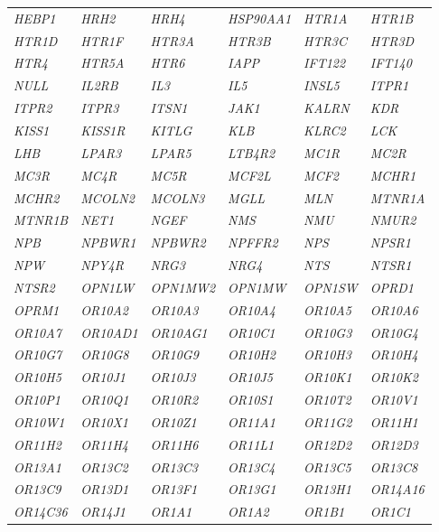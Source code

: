\begin{longtable}{>{\em}l>{\em}l>{\em}l>{\em}l>{\em}l>{\em}l}
  HEBP1 & HRH2 & HRH4 & HSP90AA1 & HTR1A & HTR1B \\ 
  \rowcolor{black!10} 
  HTR1D & HTR1F & HTR3A & HTR3B & HTR3C & HTR3D \\ 
  \rowcolor{black!5} 
  HTR4 & HTR5A & HTR6 & IAPP & IFT122 & IFT140 \\ 
  \rowcolor{black!10} 
  NULL & IL2RB & IL3 & IL5 & INSL5 & ITPR1 \\ 
  \rowcolor{black!5} 
  ITPR2 & ITPR3 & ITSN1 & JAK1 & KALRN & KDR \\ 
  \rowcolor{black!10} 
  KISS1 & KISS1R & KITLG & KLB & KLRC2 & LCK \\ 
  \rowcolor{black!5} 
  LHB & LPAR3 & LPAR5 & LTB4R2 & MC1R & MC2R \\ 
  \rowcolor{black!10} 
  MC3R & MC4R & MC5R & MCF2L & MCF2 & MCHR1 \\ 
  \rowcolor{black!5} 
  MCHR2 & MCOLN2 & MCOLN3 & MGLL & MLN & MTNR1A \\ 
  \rowcolor{black!10} 
  MTNR1B & NET1 & NGEF & NMS & NMU & NMUR2 \\ 
  \rowcolor{black!5} 
  NPB & NPBWR1 & NPBWR2 & NPFFR2 & NPS & NPSR1 \\ 
  \rowcolor{black!10} 
  NPW & NPY4R & NRG3 & NRG4 & NTS & NTSR1 \\ 
  \rowcolor{black!5} 
  NTSR2 & OPN1LW & OPN1MW2 & OPN1MW & OPN1SW & OPRD1 \\ 
  \rowcolor{black!10} 
  OPRM1 & OR10A2 & OR10A3 & OR10A4 & OR10A5 & OR10A6 \\ 
  \rowcolor{black!5} 
  OR10A7 & OR10AD1 & OR10AG1 & OR10C1 & OR10G3 & OR10G4 \\ 
  \rowcolor{black!10} 
  OR10G7 & OR10G8 & OR10G9 & OR10H2 & OR10H3 & OR10H4 \\ 
  \rowcolor{black!5} 
  OR10H5 & OR10J1 & OR10J3 & OR10J5 & OR10K1 & OR10K2 \\ 
  \rowcolor{black!10} 
  OR10P1 & OR10Q1 & OR10R2 & OR10S1 & OR10T2 & OR10V1 \\ 
  \rowcolor{black!5} 
  OR10W1 & OR10X1 & OR10Z1 & OR11A1 & OR11G2 & OR11H1 \\ 
  \rowcolor{black!10} 
  OR11H2 & OR11H4 & OR11H6 & OR11L1 & OR12D2 & OR12D3 \\ 
  \rowcolor{black!5} 
  OR13A1 & OR13C2 & OR13C3 & OR13C4 & OR13C5 & OR13C8 \\ 
  \rowcolor{black!10} 
  OR13C9 & OR13D1 & OR13F1 & OR13G1 & OR13H1 & OR14A16 \\ 
  \rowcolor{black!5} 
  OR14C36 & OR14J1 & OR1A1 & OR1A2 & OR1B1 & OR1C1 \\ 

\end{longtable}
